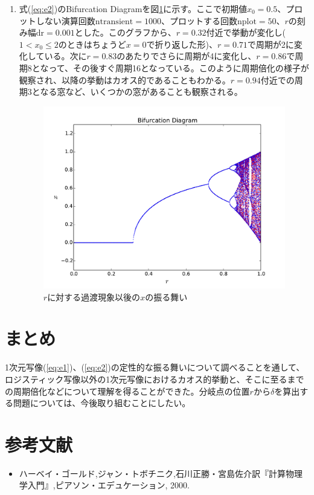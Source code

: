 \documentclass{jsarticle}
\begin{document}
\begin{enumerate}
\begin{enumerate}
				\item 式(\ref{eq:e2})のBifurcation Diagramを図\ref{fig:f5}に示す。ここで初期値$x_{0}=0.5$、プロットしない演算回数$\mathrm{ntransient}=1000$、プロットする回数$\mathrm{nplot}=50$、$r$の刻み幅$\mathrm{dr}=0.001$とした。このグラフから、$r=0.32$付近で挙動が変化し($1<x_{0} \le 2$のときはちょうど$x=0$で折り返した形)、$r=0.71$で周期が2に変化している。次に$r=0.83$のあたりでさらに周期が4に変化し、$r=0.86$で周期8となって、その後すぐ周期16となっている。このように周期倍化の様子が観察され、以降の挙動はカオス的であることもわかる。$r=0.94$付近での周期3となる窓など、いくつかの窓があることも観察される。
				\begin{figure}[H]
					\begin{center}
						\includegraphics[width=12.5cm]{figure_2-1.pdf}
						\caption{$r$に対する過渡現象以後の$x$の振る舞い}
						\label{fig:f5}
					\end{center}
				\end{figure}
			
			\end{enumerate}
			
		\end{enumerate}
	
	\section{まとめ}
		1次元写像(\ref{eq:e1})、(\ref{eq:e2})の定性的な振る舞いについて調べることを通して、ロジスティック写像以外の1次元写像におけるカオス的挙動と、そこに至るまでの周期倍化などについて理解を得ることができた。分岐点の位置$r$から$\delta$を算出する問題については、今後取り組むことにしたい。
	
	\section{参考文献}
		\begin{itemize}
			\item ハーベイ・ゴールド,ジャン・トボチニク,石川正勝・宮島佐介訳『計算物理学入門』,ピアソン・エデュケーション, 2000.
		\end{itemize}
\end{document}
